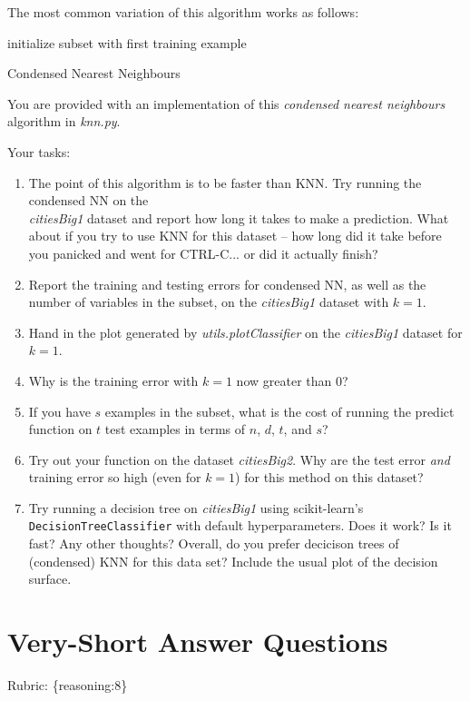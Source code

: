 \documentclass{article}
\def\blu#1{{\color{blu}#1}}
\def\gre#1{{\color{gre}#1}}
\def\enum#1{\begin{enumerate}#1\end{enumerate}}
\def\rubric#1{\gre{Rubric: \{#1\}}}{}
\begin{document}
The most common variation of this algorithm works as follows:

\begin{algorithm}[H]
 initialize subset with first training example\;
 \caption{Condensed Nearest Neighbours}
\end{algorithm}

You are provided with an implementation of this \emph{condensed nearest neighbours} algorithm in \emph{knn.py}.

Your tasks:

\blu{
\enum{
\item The point of this algorithm is to be faster than KNN. Try running the condensed NN on the\\\emph{citiesBig1} dataset and report how long it takes to make a prediction. What about if you try to use KNN for this dataset -- how long did it take before you panicked and went for CTRL-C... or did it actually finish?
\item Report the training and testing errors for condensed NN, as well as the number of variables in the subset, on the \emph{citiesBig1} dataset with $k=1$.
\item Hand in the plot generated by \emph{utils.plotClassifier} on the \emph{citiesBig1} dataset for $k=1$.
\item Why is the training error with $k=1$ now greater than $0$?
\item If you have $s$ examples in the subset, what is the cost of running the predict function on $t$ test examples in terms of $n$, $d$, $t$, and $s$?
\item Try out your function on the dataset \emph{citiesBig2}. Why are the  test error \emph{and} training error so high (even for $k=1$) for this method on this dataset?
\item Try running a decision tree on \emph{citiesBig1} using scikit-learn's \texttt{DecisionTreeClassifier} with default hyperparameters. Does it work? Is it fast? Any other thoughts? Overall, do you prefer decicison trees of (condensed) KNN for this data set? Include the usual plot of the decision surface. 
}
}



\section{Very-Short Answer Questions}
\rubric{reasoning:8}
\end{document}
